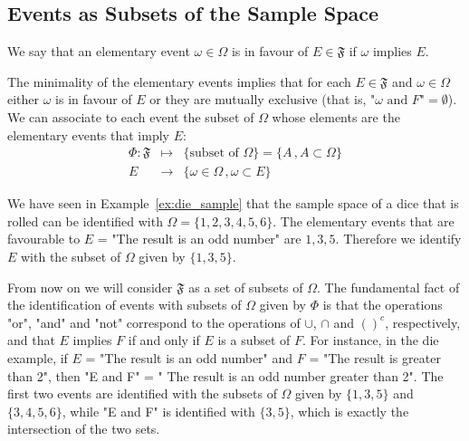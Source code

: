 \subsection{ Events as Subsets of the Sample Space}
	\label{ss:subset}
\begin{definition}
	We say that an elementary event $\omega \in \Omega$ is in favour of $E \in \mathfrak F$ if $\omega$ implies $E$. 
\end{definition}
The minimality of the elementary events implies that for each $E \in \mathfrak F$ and $\omega \in \Omega$ either $\omega$ is in favour of $E$ or they are mutually exclusive (that is, $ \text{"$\omega$ and $F$"} = \emptyset$). We can associate to each event the subset of $\Omega$ whose elements are the elementary events that imply $E$: 
\begin{equation}
	\label{e:abstract_to_concrete}
	\begin{array}{ccc}
		\Phi: \mathfrak F & \mapsto & \{ \text{subset of $\Omega$}\} = \{A\,, A \subset \Omega\}\\
		E & \to & \{ \omega \in \Omega \, ,  \omega \subset E\} 
	\end{array}
\end{equation}
\begin{example}[Dice]
		\label{ex:die_subset}
	We have seen in Example~\ref{ex:die_sample} that the sample space of a dice that is rolled can be identified with $\Omega = \{1,2,3,4,5,6\}$. The elementary events that are favourable to $E $ = "The result is an odd number" are $1,3,5$. Therefore we identify $E$ with the subset of $\Omega$ given by $\{1,3,5\}$. 	
\end{example}

From now on we will consider $\mathfrak F$ as a set of subsets of $\Omega$. The fundamental fact of the identification of events with subsets of $\Omega$ given by $\Phi$ is that the operations "or", "and" and "not" correspond to the operations of $\cup$, $\cap$ and $ ()^c$, respectively, and that $E$ implies $F$ if and only if $E$ is a subset of $F$. For instance, in the die example, if $E$ = "The result is an odd number" and $F$ = "The result is greater than 2", then  "E and F" = " The result is an odd number greater than 2". The first two events are identified with the subsets of $\Omega$ given by $\{1,3,5\}$ and $\{3,4,5,6\}$, while "E and F" is identified with $\{3,5\}$, which is exactly the intersection of the two sets. \\

